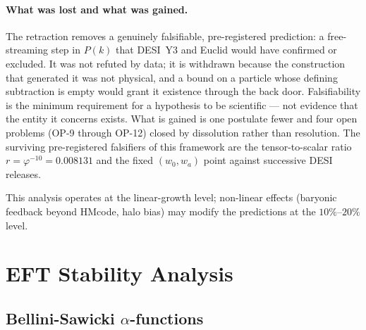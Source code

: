\documentclass[12pt,a4paper]{article}
\begin{document}
\paragraph{What was lost and what was gained.} The retraction removes a
genuinely falsifiable, pre-registered prediction: a free-streaming step in
$P(k)$ that DESI~Y3 and Euclid would have confirmed or excluded. It was not
refuted by data; it is withdrawn because the construction that generated it was
not physical, and a bound on a particle whose defining subtraction is empty
would grant it existence through the back door. Falsifiability is the minimum
requirement for a hypothesis to be scientific --- not evidence that the entity
it concerns exists. What is gained is one postulate fewer and four open
problems (OP-9 through OP-12) closed by dissolution rather than resolution.
The surviving pre-registered falsifiers of this framework are the
tensor-to-scalar ratio $r=\varphi^{-10}=0.008131$ and the fixed $(w_0,w_a)$
point against successive DESI releases.

This analysis operates at the linear-growth level; non-linear effects
(baryonic feedback beyond HMcode, halo bias) may modify the predictions at the
$10\%$--$20\%$ level.


\section{EFT Stability Analysis}
\label{sec:eft}

\subsection{Bellini-Sawicki $\alpha$-functions}
\label{sec:alphas}
\end{document}
